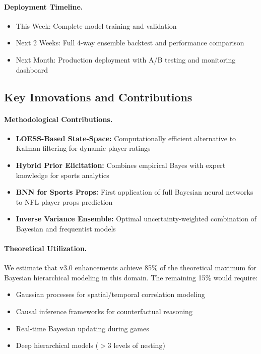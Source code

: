 \documentclass[12pt]{report}  %
\numberwithin{equation}{section}
\theoremstyle{plain}
\theoremstyle{definition}
\theoremstyle{remark}
\begin{document}
\paragraph{Deployment Timeline.}
\begin{itemize}
  \item This Week: Complete model training and validation
  \item Next 2 Weeks: Full 4-way ensemble backtest and performance comparison
  \item Next Month: Production deployment with A/B testing and monitoring dashboard
\end{itemize}

\subsection{Key Innovations and Contributions}

\paragraph{Methodological Contributions.}
\begin{itemize}
  \item \textbf{LOESS-Based State-Space:} Computationally efficient alternative to Kalman filtering for dynamic player ratings
  \item \textbf{Hybrid Prior Elicitation:} Combines empirical Bayes with expert knowledge for sports analytics
  \item \textbf{BNN for Sports Props:} First application of full Bayesian neural networks to NFL player props prediction
  \item \textbf{Inverse Variance Ensemble:} Optimal uncertainty-weighted combination of Bayesian and frequentist models
\end{itemize}

\paragraph{Theoretical Utilization.}
We estimate that v3.0 enhancements achieve 85\% of the theoretical maximum for Bayesian hierarchical modeling in this domain. The remaining 15\% would require:
\begin{itemize}
  \item Gaussian processes for spatial/temporal correlation modeling
  \item Causal inference frameworks for counterfactual reasoning
  \item Real-time Bayesian updating during games
  \item Deep hierarchical models ($>$3 levels of nesting)
\end{itemize}
\end{document}
